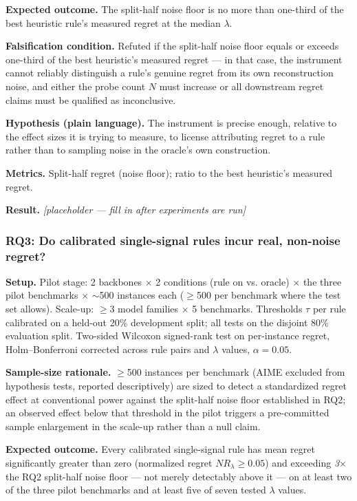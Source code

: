 \documentclass[11pt]{article}
\newcommand{\ph}{\textit{[placeholder --- fill in after experiments are run]}}
\begin{document}
\textbf{Expected outcome.} The split-half noise floor is no more than one-third of the best heuristic rule's measured regret at the median $\lambda$.

\textbf{Falsification condition.} Refuted if the split-half noise floor equals or exceeds one-third of the best heuristic's measured regret --- in that case, the instrument cannot reliably distinguish a rule's genuine regret from its own reconstruction noise, and either the probe count $N$ must increase or all downstream regret claims must be qualified as inconclusive.

\textbf{Hypothesis (plain language).} The instrument is precise enough, relative to the effect sizes it is trying to measure, to license attributing regret to a rule rather than to sampling noise in the oracle's own construction.

\textbf{Metrics.} Split-half regret (noise floor); ratio to the best heuristic's measured regret.

\textbf{Result.} \ph

\subsubsection{RQ3: Do calibrated single-signal rules incur real, non-noise regret?}
\textbf{Setup.} Pilot stage: 2 backbones $\times$ 2 conditions (rule on vs. oracle) $\times$ the three pilot benchmarks $\times$ $\sim$500 instances each ($\geq$500 per benchmark where the test set allows). Scale-up: $\geq$3 model families $\times$ 5 benchmarks. Thresholds $\tau$ per rule calibrated on a held-out 20\% development split; all tests on the disjoint 80\% evaluation split. Two-sided Wilcoxon signed-rank test on per-instance regret, Holm--Bonferroni corrected across rule pairs and $\lambda$ values, $\alpha = 0.05$.

\textbf{Sample-size rationale.} $\geq$500 instances per benchmark (AIME excluded from hypothesis tests, reported descriptively) are sized to detect a standardized regret effect at conventional power against the split-half noise floor established in RQ2; an observed effect below that threshold in the pilot triggers a pre-committed sample enlargement in the scale-up rather than a null claim.

\textbf{Expected outcome.} Every calibrated single-signal rule has mean regret significantly greater than zero (normalized regret $NR_\lambda \geq 0.05$) and exceeding \emph{3$\times$} the RQ2 split-half noise floor --- not merely detectably above it --- on at least two of the three pilot benchmarks and at least five of seven tested $\lambda$ values.
\end{document}
